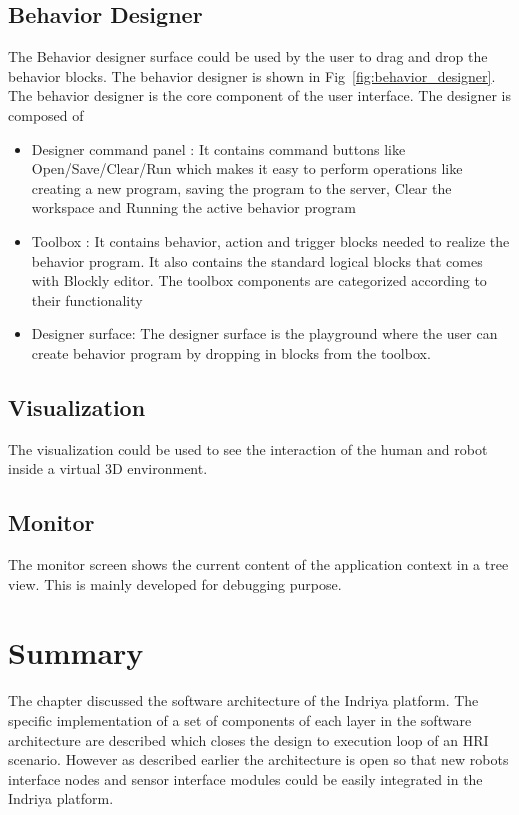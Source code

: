 \subsection*{Behavior Designer} The Behavior designer surface could be used by the user to drag and drop the behavior blocks. The behavior designer is shown in Fig~\ref{fig:behavior_designer}.
The behavior designer is the core component of the user interface. The designer is composed of 
\begin{itemize}
\item Designer command panel : It contains command buttons like Open/Save/Clear/Run which makes it easy to perform operations like creating a new program, saving the program to the server, Clear the workspace and Running the active behavior program
\item Toolbox : It contains behavior, action and trigger blocks needed to realize the behavior program. It also contains the standard logical blocks that comes with Blockly editor. The toolbox components are categorized according to their functionality
\item Designer surface: The designer surface is the playground where the user can create behavior program by dropping in blocks from the toolbox.
\end{itemize}
\subsection*{Visualization} The visualization could be used to see the interaction of the human and robot inside a virtual 3D environment.
\subsection*{Monitor}
The monitor screen shows the current content of the application context in a tree view. This is mainly developed for debugging purpose.
\section{Summary}
The chapter discussed the software architecture of the Indriya platform. The specific implementation of a set of components of each layer in the software architecture are described which closes the design to execution loop of an HRI scenario. However as described earlier the architecture is open so that new robots interface nodes and sensor interface modules could be easily integrated in the Indriya platform.
